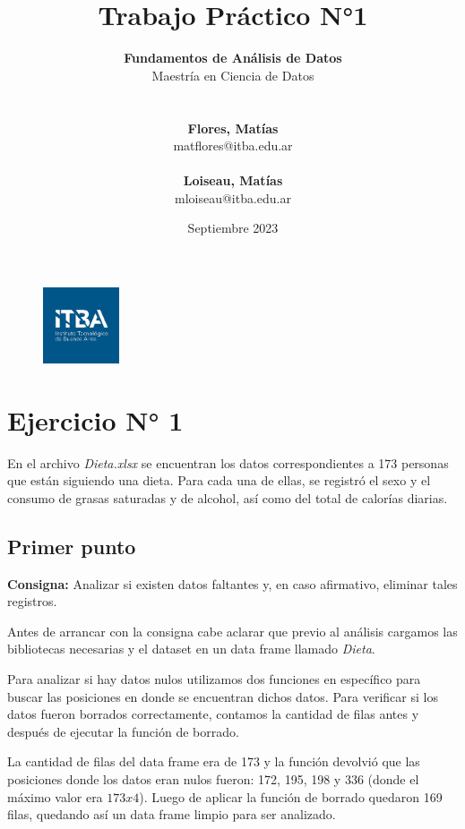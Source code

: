 \documentclass{article} %
\title{Trabajo Práctico N°1} %
\date{Septiembre 2023} %
\author{
	\textbf{Fundamentos de Análisis de Datos}\\
	Maestría en Ciencia de Datos\\
	\\~\\
	\textbf{Flores, Matías}\\
	matflores@itba.edu.ar
 	\\~\\
 	\textbf{Loiseau, Matías}\\
 	mloiseau@itba.edu.ar
}
\begin{document}

\begin{figure}
\centering
	\includegraphics[width=0.2\textwidth]{images/itba-logo}
	\label{fig:itba-logo}
\end{figure}
\maketitle %

\thispagestyle{empty} %
\cleardoublepage

\cleardoublepage
\tableofcontents %
\cleardoublepage


\section{Ejercicio N° 1}

En el archivo \textit{Dieta.xlsx} se encuentran los datos correspondientes a 173 personas que están siguiendo una dieta. Para cada una de ellas, se registró el sexo y el consumo de grasas saturadas y de alcohol, así como del total de calorías diarias.

\subsection{Primer punto}

\textbf{Consigna:} Analizar si existen datos faltantes y, en caso afirmativo, eliminar tales registros.

Antes de arrancar con la consigna cabe aclarar que previo al análisis cargamos las bibliotecas necesarias y el dataset en un data frame llamado \textit{Dieta}.

Para analizar si hay datos nulos utilizamos dos funciones en específico para buscar las posiciones en donde se encuentran dichos datos. Para verificar si los datos fueron borrados correctamente, contamos la cantidad de filas antes y después de ejecutar la función de borrado. 

La cantidad de filas del data frame era de 173 y la función devolvió que las posiciones donde los datos eran nulos fueron: 172, 195, 198 y 336 (donde el máximo valor era $173 x 4$). Luego de aplicar la función de borrado quedaron 169 filas, quedando así un data frame limpio para ser analizado.
\end{document}
